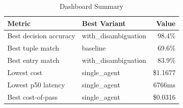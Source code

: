 \begin{table}[htbp]
\centering
\caption{Dashboard Summary}
\label{tab:summary}
\begin{tabular}{l l r}
\toprule
Metric & Best Variant & Value \\
\midrule
  Best decision accuracy & with\_disambiguation & 98.4\% \\
  Best tuple match & baseline & 69.6\% \\
  Best entry match & with\_disambiguation & 83.9\% \\
  Lowest cost & single\_agent & \$1.1677 \\
  Lowest p50 latency & single\_agent & 6766ms \\
  Best cost-of-pass & single\_agent & \$0.0316 \\
\bottomrule
\end{tabular}
\end{table}
